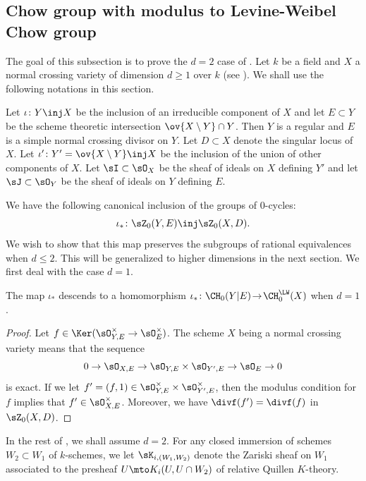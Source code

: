 \subsection{Chow group with modulus to
Levine-Weibel Chow group}\label{sec:CMLW}
The goal of this subsection is to prove the $d =2$ case of .
Let $k$ be a field and $X$ a normal crossing variety of dimension $d \ge 1$ over $k$
(see ).
We shall use the following notations in this section.

Let $\iota \colon Y \inj X$ be the inclusion of an irreducible component
of $X$ and let $E \subset Y$ be the scheme theoretic intersection
$\ov{X \setminus Y} \cap Y$. Then $Y$ is a regular
and $E$ is a simple normal crossing
divisor on $Y$. Let $D \subset X$ denote the singular locus of $X$.
Let $\iota' \colon Y' = \ov{X \setminus Y} \inj X$ be the inclusion of the
union of other components of $X$.
Let $\sI \subset \sO_X$ be the sheaf of ideals on $X$ defining $Y'$
and let $\sJ \subset \sO_Y$ be the sheaf of ideals on $Y$ defining $E$.

We have the following canonical inclusion of the groups of $0$-cycles:
\begin{equation}\label{eqn:$0$-cycle-incl}
\iota_* \colon \sZ_0(Y, E) \inj \sZ_0(X, D).
\end{equation}
We wish to show that this map preserves the subgroups
of rational equivalences when $d \le 2$. This will be generalized
to higher dimensions in the next section. We first deal with the case $d =1$.

\begin{lem}\label{lem:NC-surface-3}
The map $\iota_*$ descends to a homomorphism
\hbox{$\iota_* \colon \CH_0(Y|E)\!\to\!\CH^{\LW}_0(X)$} when $d = 1$.
\end{lem}
\begin{proof}
Let $f \in \Ker(\sO^{\times}_{Y, E} \to
\sO^{\times}_{E})$.
The scheme $X$ being a normal crossing variety means that the
sequence
\begin{equation}\label{eqn:NC-surface-3-0}
0 \to \sO_{X, E} \to \sO_{Y,E} \times \sO_{Y',E} \to \sO_{E} \to 0
\end{equation}
is exact.
If we let $f' = (f,1) \in \sO^{\times}_{Y,E} \times \sO^{\times}_{Y',E}$, then
the modulus condition for $f$ implies that $f' \in \sO^{\times}_{X,E}$.
Moreover, we have $\divf(f') = \divf(f)$ in $\sZ_0(X,D)$.
\end{proof}

In the rest of , we shall assume $d = 2$.
For any closed immersion of schemes $W_2 \subset W_1$ of $k$-schemes, we let
$\sK_{i, (W_1, W_2)}$ denote the Zariski sheaf on $W_1$ associated to the
presheaf $U \mto K_i(U, U \cap W_2)$ of relative Quillen $K$-theory.

